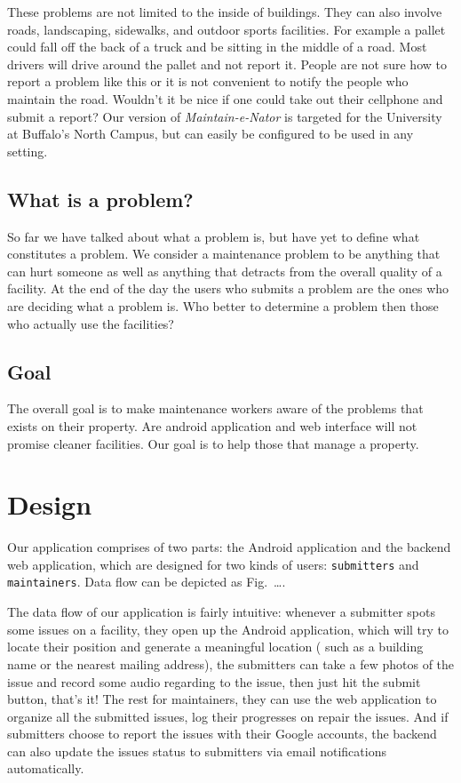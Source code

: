 \documentclass{acm_proc_article-sp}
\begin{document}
These problems are not limited to the inside of buildings. They can also involve roads, landscaping, sidewalks, and outdoor sports facilities. For example a pallet could fall off the back of a truck and be sitting in the middle of a road. Most drivers will drive around the pallet and not report it. People are not sure how to report a problem like this or it is not convenient to notify the people who maintain the road. Wouldn't it be nice if one could take out their cellphone and submit a report? Our version of \textit{Maintain-e-Nator} is targeted for the University at Buffalo's North Campus, but can easily be configured to be used in any setting.

\subsection{What is a problem?}
So far we have talked about what a problem is, but have yet to define what constitutes a problem. We consider a maintenance problem to be anything that can hurt someone as well as anything that detracts from the overall quality of a facility. At the end of the day the users who submits a problem are the ones who are deciding what a problem is.  Who better to determine a problem then those who actually use the facilities?  

\subsection{Goal}
The overall goal is to make maintenance workers aware of the problems that exists on their property. 
Are android application and web interface will not promise cleaner facilities. Our goal is to help those that manage a property.

\section{Design}
Our application comprises of two parts: the Android application and the backend web application, which are designed for two kinds of users:
\texttt{submitters} and \texttt{maintainers}. Data flow can be depicted as Fig.~\ldots.

The data flow of our application is fairly intuitive: whenever a submitter spots some issues on a facility, they open up the Android application, which will
try to locate their position and generate a meaningful location ( such as a building name or the nearest mailing address), the submitters can take a few photos of the issue and record some audio regarding to the issue, then just hit the submit button, that's it! The rest for maintainers, they can use the web application to organize all the submitted issues, log their progresses on repair the issues. And if submitters choose to report the issues with their Google accounts, the backend can also update the issues status to submitters via email notifications automatically.
\end{document}
